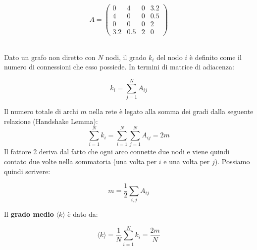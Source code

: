 \noindent
\begin{minipage}{0.35\textwidth}
\begin{equation*}
A = 
\begin{pmatrix} 
0 & 4 & 0 & 3.2 \\ 
4 & 0 & 0 & 0.5 \\ 
0 & 0 & 0 & 2 \\ 
3.2 & 0.5 & 2 & 0 
\end{pmatrix}
\end{equation*}
\end{minipage}%
\hfill
\begin{minipage}{0.55\textwidth}
\centering
{}
\end{minipage}

\hfill \\


\noindent Dato un grafo non diretto con $N$ nodi, il grado $k_i$ del nodo $i$ è definito come il numero di connessioni che esso possiede. In termini di matrice di adiacenza:
\begin{tcolorbox}[colback=yellow!25, colframe=yellow!75!orange, coltitle=black, title=\textbf{Grado di un nodo}]
\begin{equation}
k_i = \sum_{j=1}^N A_{ij}
\end{equation}
\end{tcolorbox}
\noindent Il numero totale di archi $m$ nella rete è legato alla somma dei gradi dalla seguente relazione (Handshake Lemma):
\begin{equation}
\sum_{i=1}^N k_i = \sum_{i=1}^N \sum_{j=1}^N A_{ij} = 2m
\end{equation}
Il fattore 2 deriva dal fatto che ogni arco connette due nodi e viene quindi contato due volte nella sommatoria (una volta per $i$ e una volta per $j$).
Possiamo quindi scrivere:
\begin{tcolorbox}[colback=yellow!25, colframe=yellow!75!orange, coltitle=black, title=\textbf{Numero totale di archi}]
\begin{equation}
m = \frac{1}{2} \sum_{i,j} A_{ij}
\end{equation}
\end{tcolorbox}
\noindent Il \textbf{grado medio} $\langle k \rangle$ è dato da:
\begin{tcolorbox}[colback=yellow!25, colframe=yellow!75!orange, coltitle=black, title=\textbf{Grado medio}]
\begin{equation}
\langle k \rangle = \frac{1}{N} \sum_{i=1}^N k_i = \frac{2m}{N}
\end{equation}
\end{tcolorbox}

